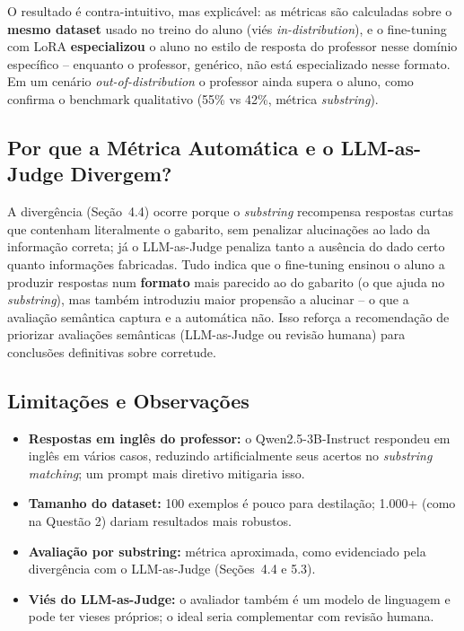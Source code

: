 \documentclass[12pt, a4paper]{article}
\begin{document}
O resultado é contra-intuitivo, mas explicável: as métricas são calculadas sobre o
\textbf{mesmo dataset} usado no treino do aluno (viés \textit{in-distribution}), e o
fine-tuning com LoRA \textbf{especializou} o aluno no estilo de resposta do professor
nesse domínio específico -- enquanto o professor, genérico, não está especializado
nesse formato. Em um cenário \textit{out-of-distribution} o professor ainda supera o
aluno, como confirma o benchmark qualitativo (55\% vs 42\%, métrica \textit{substring}).

\subsection{Por que a Métrica Automática e o LLM-as-Judge Divergem?}

A divergência (Seção~4.4) ocorre porque o \textit{substring} recompensa respostas
curtas que contenham literalmente o gabarito, sem penalizar alucinações ao lado da
informação correta; já o LLM-as-Judge penaliza tanto a ausência do dado certo quanto
informações fabricadas. Tudo indica que o fine-tuning ensinou o aluno a produzir
respostas num \textbf{formato} mais parecido ao do gabarito (o que ajuda no
\textit{substring}), mas também introduziu maior propensão a alucinar -- o que a
avaliação semântica captura e a automática não. Isso reforça a recomendação de
priorizar avaliações semânticas (LLM-as-Judge ou revisão humana) para conclusões
definitivas sobre corretude.

\subsection{Limitações e Observações}

\begin{itemize}
  \item \textbf{Respostas em inglês do professor:} o Qwen2.5-3B-Instruct respondeu
        em inglês em vários casos, reduzindo artificialmente seus acertos no
        \textit{substring matching}; um prompt mais diretivo mitigaria isso.
  \item \textbf{Tamanho do dataset:} 100 exemplos é pouco para destilação; 1.000+
        (como na Questão 2) dariam resultados mais robustos.
  \item \textbf{Avaliação por substring:} métrica aproximada, como evidenciado pela
        divergência com o LLM-as-Judge (Seções~4.4 e 5.3).
  \item \textbf{Viés do LLM-as-Judge:} o avaliador também é um modelo de linguagem e
        pode ter vieses próprios; o ideal seria complementar com revisão humana.
\end{itemize}
\end{document}
